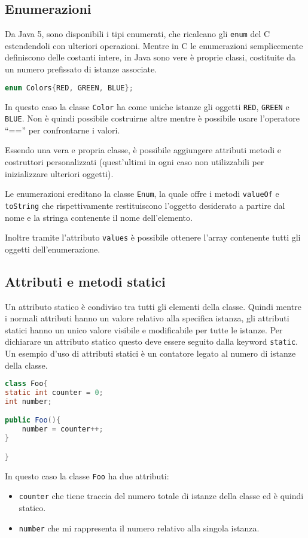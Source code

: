 \documentclass{article}
\begin{document}
\subsection{Enumerazioni}

Da Java 5, sono disponibili i tipi enumerati, che
ricalcano gli \texttt{enum} del C estendendoli con
ulteriori operazioni.
Mentre in C le enumerazioni semplicemente definiscono delle
costanti intere, in Java sono vere è proprie classi,
costituite da un numero prefissato di istanze associate.
\begin{lstlisting}[language=Java,escapechar=|]
enum Colors{RED, GREEN, BLUE};
\end{lstlisting}  
In questo caso la classe \texttt{Color}
ha come uniche istanze gli oggetti \texttt{RED},
\texttt{GREEN} e \texttt{BLUE}.
Non è quindi possibile costruirne altre mentre è possibile
usare l'operatore ``=='' per confrontarne i valori.

Essendo una vera e propria classe, è possibile aggiungere
attributi metodi e
costruttori personalizzati (quest'ultimi in ogni caso non utilizzabili per inizializzare ulteriori oggetti).

Le enumerazioni ereditano la classe \texttt{Enum},
la quale offre i metodi \texttt{valueOf} e \texttt{toString}
che rispettivamente restituiscono l'oggetto desiderato
a partire dal nome e la stringa contenente il nome dell'elemento.

Inoltre tramite l'attributo \texttt{values} è possibile ottenere
l'array contenente tutti gli oggetti dell'enumerazione.

\subsection{Attributi e metodi statici}

Un attributo statico è condiviso tra tutti gli elementi della classe.
Quindi mentre i normali attributi hanno un valore relativo
alla specifica istanza, gli attributi statici hanno un unico
valore visibile e modificabile per tutte le istanze.
Per dichiarare un attributo statico questo deve essere seguito
dalla keyword \texttt{static}.
Un esempio d'uso di attributi statici
è un contatore legato al numero di istanze della classe. 
\begin{lstlisting}[language=Java,escapechar=|]
class Foo{
static int counter = 0;
int number;

public Foo(){
	number = counter++;
}

}
\end{lstlisting} 
In questo caso la classe \texttt{Foo} ha due attributi:
\begin{itemize}
	\item \texttt{counter} che tiene traccia del numero totale
		di istanze della classe ed è quindi statico.
	\item \texttt{number} che mi rappresenta il numero relativo 
		alla singola istanza.
\end{itemize}
\end{document}

